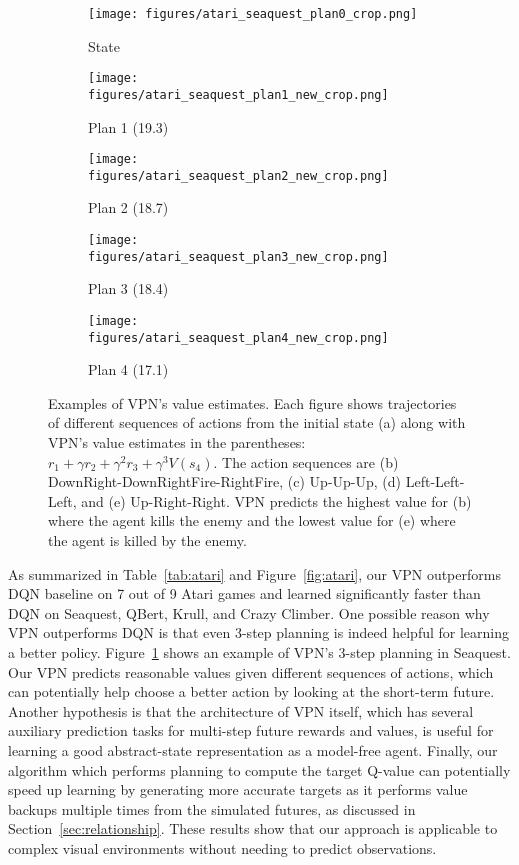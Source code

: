 \documentclass{article}
\begin{document}
\begin{figure}[!]
	\centering
	\begin{subfigure}{0.185\linewidth}
    		\centering
	    \texttt{[image: figures/atari\_seaquest\_plan0\_crop.png]}
	    \caption{State}  
   	\end{subfigure}   	
   	\hfill
   	\begin{subfigure}{0.185\linewidth}
    		\centering
	    \texttt{[image: figures/atari\_seaquest\_plan1\_new\_crop.png]} 
	    \caption{Plan 1 (19.3)}
   	\end{subfigure} 
   	\hfill
   	\begin{subfigure}{0.185\linewidth}
    		\centering
	    \texttt{[image: figures/atari\_seaquest\_plan2\_new\_crop.png]}  
	    \caption{Plan 2 (18.7)}
   	\end{subfigure}
   	\hfill
   	\begin{subfigure}{0.185\linewidth}
    		\centering
	    \texttt{[image: figures/atari\_seaquest\_plan3\_new\_crop.png]}  
	    \caption{Plan 3 (18.4)}
   	\end{subfigure} 
   	\hfill
	\begin{subfigure}{0.185\linewidth}
    		\centering
	    \texttt{[image: figures/atari\_seaquest\_plan4\_new\_crop.png]}  
	    \caption{Plan 4 (17.1)}
   	\end{subfigure}
\caption{Examples of VPN's value estimates. Each figure shows trajectories of different sequences of actions from the initial state (a) along with VPN's value estimates in the parentheses: $r_1+\gamma r_2+ \gamma^2 r_3 + \gamma^3 V(s_4)$. The action sequences are (b) DownRight-DownRightFire-RightFire, (c) Up-Up-Up, (d) Left-Left-Left, and (e) Up-Right-Right. VPN predicts the highest value for (b) where the agent kills the enemy and the lowest value for (e) where the agent is killed by the enemy. } 
	\vspace{-10pt}
	\label{fig:atari-plan}
\end{figure}


As summarized in Table~\ref{tab:atari} and Figure~\ref{fig:atari}, our VPN outperforms DQN baseline on 7 out of 9 Atari games and learned significantly faster than DQN on Seaquest, QBert, Krull, and Crazy Climber. 
One possible reason why VPN outperforms DQN is that even 3-step planning is indeed helpful for learning a better policy. Figure~\ref{fig:atari-plan} shows an example of VPN's 3-step planning in Seaquest. Our VPN predicts reasonable values given different sequences of actions, which can potentially help choose a better action by looking at the short-term future.
 Another hypothesis is that the architecture of VPN itself, which has several auxiliary prediction tasks for multi-step future rewards and values, is useful for learning a good abstract-state representation as a model-free agent. Finally, our algorithm which performs planning to compute the target Q-value can potentially speed up learning by generating more accurate targets as it performs value backups multiple times from the simulated futures, as discussed in Section~\ref{sec:relationship}. These results show that our approach is applicable to complex visual environments without needing to predict observations.
 
\end{document}
